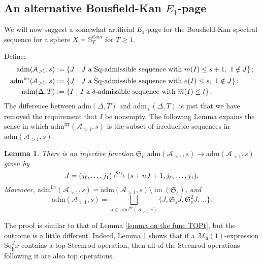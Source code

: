\documentclass[11pt]{amsart} \renewcommand{\baselinestretch}{1.2}
\theoremstyle{plain}
\newtheorem{lem}[thm]{Lemma}
\theoremstyle{definition}
\DeclareMathOperator{\im}{im}
\renewcommand{\to}{\longrightarrow}
\newcommand{\scrC}{\mathscr{C}}
\newcommand{\calA}{\mathcal{A}}
\newcommand{\calMh}{\mathcal{M}\dhor}
\newcommand{\minDimP}{\overline{m}}
\newcommand{\minDimDelta}{m}
\newcommand{\Sq}{\mathrm{Sq}}
\newcommand{\LieSteen}{\calA}
\newcommand{\aDT}{\mathrm{adm}_+(\Delta,T)}
\newcommand{\aDTnoplus}{\mathrm{adm}(\Delta,T)}
\newcommand{\aS}[1]{\mathrm{adm}(\LieSteen_{>1},#1)}
\newcommand{\aSirr}[1]{\mathrm{adm}^\mathrm{irr}(\LieSteen_{>1},#1)}
\newcommand{\algs}{{\scrC\!\textit{om}}}
\newcommand{\STOP}{\mathfrak{S}}
\newcommand{\dhor}{_\mathrm{h}}
\newcommand{\Sqh}{\mathrm{Sq}\dhor}
\begin{document}
\begin{Calculations of HWn}
\subsection{An alternative Bousfield-Kan $E_1$-page}
\label{An alternative Bousfield-Kan E1}
We will now suggest a somewhat artificial $E_1$-page for the Bousfield-Kan spectral sequence for a  sphere  $X=\mathbb{S}_{T}^{\algs}$ for $T\geq1$. 

Define:
\begin{alignat*}{2}
\aS{s}&:=\left\{J\ \middle|\ \textup{$J$ a $\Sq$-admissible sequence with }\minDimDelta(I)\leq s+1,\ 1\notin J\right\};\\
\aSirr{s}&:=\left\{J\ \middle|\ \textup{$J$ a $\Sq$-admissible sequence with }e(I)\leq s,\ 1\notin J\right\};\\
\aDTnoplus&:=\left\{I\ \middle|\ \textup{$I$ a $\delta$-admissible sequence with }\minDimP(I)\leq t\right\}.
\end{alignat*}
The difference between $\aDTnoplus$ and $\aDT$ is just that we have removed the requirement that $I$ be nonempty. The following Lemma expains the sense in which $\aSirr{s}$ is the subset of irreducible sequences in $\aS{s}$.
\begin{lem}
\label{lemma on the func STOPs}
There is an injective function $\STOP_t:\aS{s}\to \aS{s}$ given by
\[J=(j_{\ell},\ldots,j_1)\overset{\smash{\STOP_s}}{\longmapsto }(s+nJ+1,j_\ell,\ldots,j_1).\]
Moreover, $\aSirr{s}=\aS{s}\setminus\im(\STOP_s)$, and
\[\aS{s}=\textstyle\bigsqcup_{J\in \aSirr{s}}\{J,\STOP_s J,\STOP_s^2 J,\ldots\}.\]
\end{lem}
\noindent The proof is similar to that of Lemma \ref{lemma on the func TOPt}, but the outcome is a little different. Indeed, Lemma \ref{lemma on the func STOPs} shows that if a $\calMh(1)$-expression $\Sqh^{J}x$ contains a top Steenrod operation, then all of the Steenrod operations following it are also top operations.


\end{Calculations of HWn}
\end{document}

